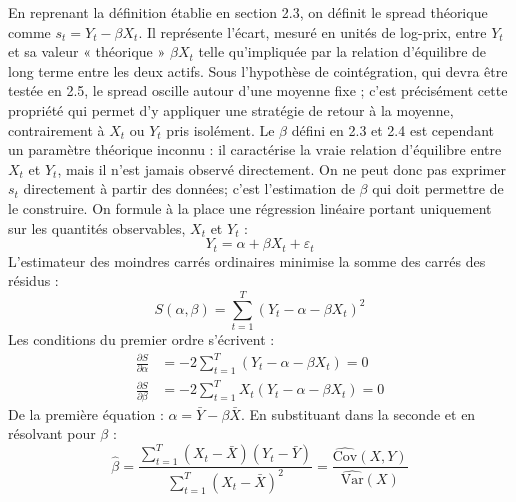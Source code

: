 \documentclass{article}
\begin{document}
En reprenant la définition établie en section 2.3, on définit le spread théorique comme $s_t = Y_t - \beta X_t$. Il représente l'écart, mesuré en unités de log-prix, entre $Y_t$ et sa valeur « théorique » $\beta X_t$ telle qu'impliquée par la relation d'équilibre de long terme entre les deux actifs. Sous l'hypothèse de cointégration, qui devra être testée en 2.5, le spread oscille autour d'une moyenne fixe ; c'est précisément cette propriété qui permet d'y appliquer une stratégie de retour à la moyenne, contrairement à $X_t$ ou $Y_t$ pris isolément.
Le $\beta$ défini en 2.3 et 2.4 est cependant un paramètre théorique inconnu : il caractérise la vraie relation d'équilibre entre $X_t$ et $Y_t$, mais il n'est jamais observé directement. On ne peut donc pas exprimer $s_t$ directement à partir des données; c'est l'estimation de $\beta$ qui doit permettre de le construire. On formule à la place une régression linéaire portant uniquement sur les quantités observables, $X_t$ et $Y_t$ :
\begin{equation}
Y_t = \alpha + \beta X_t + \varepsilon_t
\end{equation}
L'estimateur des moindres carrés ordinaires minimise la somme des carrés des résidus :
\begin{equation}
S(\alpha, \beta) = \sum_{t=1}^{T} \left(Y_t - \alpha - \beta X_t\right)^2
\end{equation}
Les conditions du premier ordre s'écrivent :
\begin{align}
\frac{\partial S}{\partial \alpha} &= -2\sum_{t=1}^{T} (Y_t - \alpha - \beta X_t) = 0 \\
\frac{\partial S}{\partial \beta} &= -2\sum_{t=1}^{T} X_t(Y_t - \alpha - \beta X_t) = 0
\end{align}
De la première équation : $\alpha = \bar{Y} - \beta \bar{X}$. En substituant dans la seconde et en résolvant pour $\beta$ :
\begin{equation}
\hat{\beta} = \frac{\sum_{t=1}^T (X_t - \bar{X})(Y_t - \bar{Y})}{\sum_{t=1}^T (X_t - \bar{X})^2} = \frac{\widehat{\text{Cov}}(X,Y)}{\widehat{\text{Var}}(X)}
\end{equation}
\end{document}
